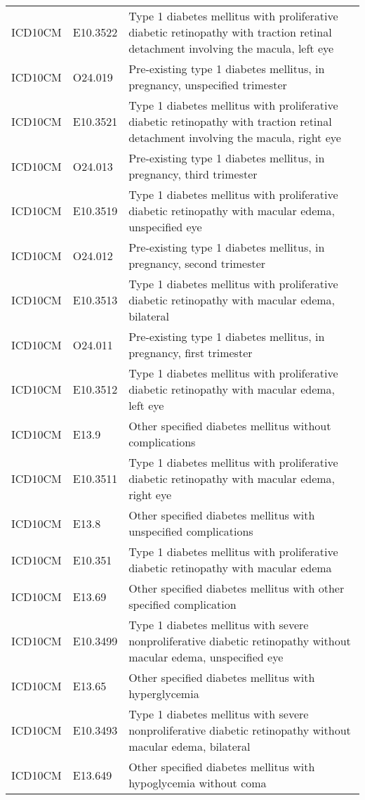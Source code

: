 \begin{table}[ht]
\begin{tabular}{lll}
  ICD10CM & E10.3522 & Type 1 diabetes mellitus with proliferative diabetic retinopathy with traction retinal detachment involving the macula, left eye \\ 
  ICD10CM & O24.019 & Pre-existing type 1 diabetes mellitus, in pregnancy, unspecified trimester \\ 
  ICD10CM & E10.3521 & Type 1 diabetes mellitus with proliferative diabetic retinopathy with traction retinal detachment involving the macula, right eye \\ 
  ICD10CM & O24.013 & Pre-existing type 1 diabetes mellitus, in pregnancy, third trimester \\ 
  ICD10CM & E10.3519 & Type 1 diabetes mellitus with proliferative diabetic retinopathy with macular edema, unspecified eye \\ 
  ICD10CM & O24.012 & Pre-existing type 1 diabetes mellitus, in pregnancy, second trimester \\ 
  ICD10CM & E10.3513 & Type 1 diabetes mellitus with proliferative diabetic retinopathy with macular edema, bilateral \\ 
  ICD10CM & O24.011 & Pre-existing type 1 diabetes mellitus, in pregnancy, first trimester \\ 
  ICD10CM & E10.3512 & Type 1 diabetes mellitus with proliferative diabetic retinopathy with macular edema, left eye \\ 
  ICD10CM & E13.9 & Other specified diabetes mellitus without complications \\ 
  ICD10CM & E10.3511 & Type 1 diabetes mellitus with proliferative diabetic retinopathy with macular edema, right eye \\ 
  ICD10CM & E13.8 & Other specified diabetes mellitus with unspecified complications \\ 
  ICD10CM & E10.351 & Type 1 diabetes mellitus with proliferative diabetic retinopathy with macular edema \\ 
  ICD10CM & E13.69 & Other specified diabetes mellitus with other specified complication \\ 
  ICD10CM & E10.3499 & Type 1 diabetes mellitus with severe nonproliferative diabetic retinopathy without macular edema, unspecified eye \\ 
  ICD10CM & E13.65 & Other specified diabetes mellitus with hyperglycemia \\ 
  ICD10CM & E10.3493 & Type 1 diabetes mellitus with severe nonproliferative diabetic retinopathy without macular edema, bilateral \\ 
  ICD10CM & E13.649 & Other specified diabetes mellitus with hypoglycemia without coma \\ 

\end{tabular}
\end{table}
